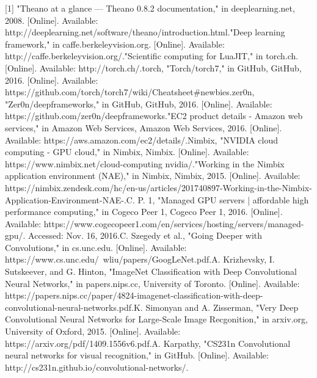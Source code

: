 \documentclass{scrreprt}
\begin{document}
[1] "Theano at a glance — Theano 0.8.2 documentation," in deeplearning.net, 2008. [Online]. Available: http://deeplearning.net/software/theano/introduction.html.\newline
[2] "Deep learning framework," in caffe.berkeleyvision.org. [Online]. Available: http://caffe.berkeleyvision.org/.\newline
[3] "Scientific computing for LuaJIT," in torch.ch. [Online]. Available: http://torch.ch/.\newline
[4] 	torch, "Torch/torch7," in GitHub, GitHub, 2016. [Online]. Available: https://github.com/torch/torch7/wiki/Cheatsheet\#newbies.\newline
[5] zer0n, "Zer0n/deepframeworks," in GitHub, GitHub, 2016. [Online]. Available: https://github.com/zer0n/deepframeworks.\newline
[6] "EC2 product details - Amazon web services," in Amazon Web Services, Amazon Web Services, 2016. [Online]. Available: https://aws.amazon.com/ec2/details/.\newline
[7] Nimbix, "NVIDIA cloud computing - GPU cloud," in Nimbix, Nimbix. [Online]. Available: https://www.nimbix.net/cloud-computing nvidia/.\newline
[8] "Working in the Nimbix application environment (NAE)," in Nimbix, Nimbix, 2015. [Online]. Available: https://nimbix.zendesk.com/hc/en-us/articles/201740897-Working-in-the-Nimbix-Application-Environment-NAE-.\newline
[9] C. P. 1, "Managed GPU servers | affordable high performance computing," in Cogeco Peer 1, Cogeco Peer 1, 2016. [Online]. Available: https://www.cogecopeer1.com/en/services/hosting/servers/managed-gpu/. Accessed: Nov. 16, 2016.\newline
[10] C. Szegedy et al., "Going Deeper with Convolutions," in cs.unc.edu. [Online]. Available: https://www.cs.unc.edu/~wliu/papers/GoogLeNet.pdf.\newline
[11] A. Krizhevsky, I. Sutskeever, and G. Hinton, "ImageNet Classification with Deep Convolutional Neural Networks," in papers.nips.cc, University of Toronto. [Online]. Available: https://papers.nips.cc/paper/4824-imagenet-classification-with-deep-convolutional-neural-networks.pdf.\newline
[12] K. Simonyan and A. Zisserman, "Very Deep Convolutional Neural Networks for Large-Scale Image Recgonition," in arxiv.org, University of Oxford, 2015. [Online]. Available: https://arxiv.org/pdf/1409.1556v6.pdf.\newline
[13] A. Karpathy, "CS231n Convolutional neural networks for visual recognition," in GitHub. [Online]. Available: http://cs231n.github.io/convolutional-networks/.\newline
\end{document}
